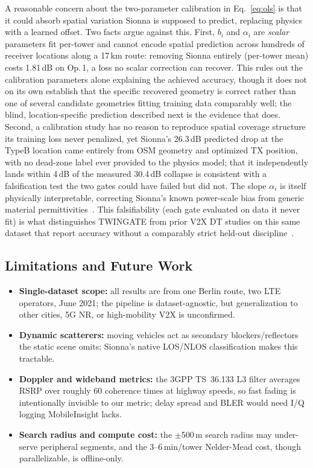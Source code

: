 \documentclass[conference]{IEEEtran}
\begin{document}
A reasonable concern about the two-parameter calibration in
Eq.~\eqref{eq:ols} is that it could absorb spatial variation Sionna is
supposed to predict, replacing physics with a learned offset. Two facts
argue against this. First, $b_i$ and $\alpha_i$ are \emph{scalar}
parameters fit per-tower and cannot encode spatial prediction across
hundreds of receiver locations along a 17\,km route: removing Sionna
entirely (per-tower mean) costs 1.81\,dB on Op.\,1, a loss no scalar
correction can recover. This rules out the calibration parameters alone
explaining the achieved accuracy, though it does not on its own establish
that the specific recovered geometry is correct rather than one of
several candidate geometries fitting training data comparably well; the
blind, location-specific prediction described next is the evidence that
does. Second, a calibration study has no reason to
reproduce spatial coverage structure its training loss never penalized,
yet Sionna's 26.3\,dB predicted drop at the TypeB location came entirely
from OSM geometry and optimized TX position, with no dead-zone label
ever provided to the physics model; that it independently lands within
4\,dB of the measured 30.4\,dB collapse is consistent with a
falsification test the two gates could have failed but did not.
The slope $\alpha_i$ is itself physically interpretable, correcting
Sionna's known power-scale bias from generic material
permittivities~\cite{manukyan2025sionna}.
This falsifiability (each gate evaluated on data it never fit) is what
distinguishes TWINGATE from prior V2X DT studies on this same dataset
that report accuracy without a comparably strict held-out
discipline~\cite{teh2023dt,partani2025qos}.

\subsection{Limitations and Future Work}

\begin{itemize}
  \item \textbf{Single-dataset scope:} all results are from one Berlin
        route, two LTE operators, June 2021; the pipeline is
        dataset-agnostic, but generalization to other cities, 5G NR, or
        high-mobility V2X is unconfirmed.
  \item \textbf{Dynamic scatterers:} moving vehicles act as secondary
        blockers/reflectors the static scene omits; Sionna's native
        LOS/NLOS classification makes this tractable.
  \item \textbf{Doppler and wideband metrics:} the 3GPP TS~36.133 L3
        filter averages RSRP over roughly 60 coherence times at highway
        speeds, so fast fading is intentionally invisible to our
        metric; delay spread and BLER would need I/Q logging
        MobileInsight lacks.
  \item \textbf{Search radius and compute cost:} the $\pm$500\,m search
        radius may under-serve peripheral segments, and the
        3--6\,min/tower Nelder-Mead cost, though parallelizable, is
        offline-only.
\end{itemize}
\end{document}
